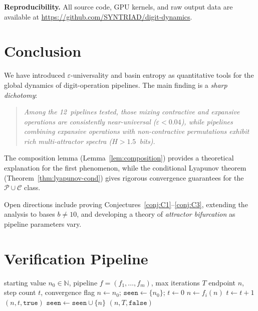 \documentclass[11pt,a4paper]{amsart}
\theoremstyle{plain}
\theoremstyle{definition}
\theoremstyle{remark}
\begin{document}
\textbf{Reproducibility.}
All source code, GPU kernels, and raw output data are available at
\url{https://github.com/SYNTRIAD/digit-dynamics}.

\section{Conclusion}\label{sec:conclusion}

We have introduced $\varepsilon$-universality and basin entropy as
quantitative tools for the global dynamics of digit-operation pipelines.
The main finding is a \emph{sharp dichotomy}:

\begin{quote}
\emph{Among the 12~pipelines tested, those mixing contractive and expansive
operations are consistently near-universal ($\varepsilon < 0.04$), while
pipelines combining expansive operations with non-contractive permutations
exhibit rich multi-attractor spectra ($H > 1.5$~bits).}
\end{quote}

The composition lemma (Lemma~\ref{lem:composition}) provides a theoretical
explanation for the first phenomenon, while the conditional Lyapunov theorem
(Theorem~\ref{thm:lyapunov-cond}) gives rigorous convergence guarantees for
the $\mathcal{P} \cup \mathcal{C}$ class.

Open directions include proving Conjectures~\ref{conj:C1}--\ref{conj:C3},
extending the analysis to bases $b \neq 10$, and developing a theory of
\emph{attractor bifurcation} as pipeline parameters vary.

\appendix
\section{Verification Pipeline}\label{app:verification}

\begin{algorithm}[ht]
\caption{Pipeline orbit computation}\label{alg:pipeline}
\begin{algorithmic}[1]
\Require starting value $n_0 \in \mathbb{N}$, pipeline $f = (f_1, \ldots, f_m)$, max iterations $T$
\Ensure endpoint $n$, step count $t$, convergence flag
\State $n \gets n_0$; $\texttt{seen} \gets \{n_0\}$; $t \gets 0$
    \State $n \gets f_i(n)$
  \EndFor
  \State $t \gets t + 1$
    \State \Return $(n, t, \texttt{true})$
  \EndIf
  \State $\texttt{seen} \gets \texttt{seen} \cup \{n\}$
\EndWhile
\State \Return $(n, T, \texttt{false})$
\end{algorithmic}
\end{algorithm}
\end{document}
